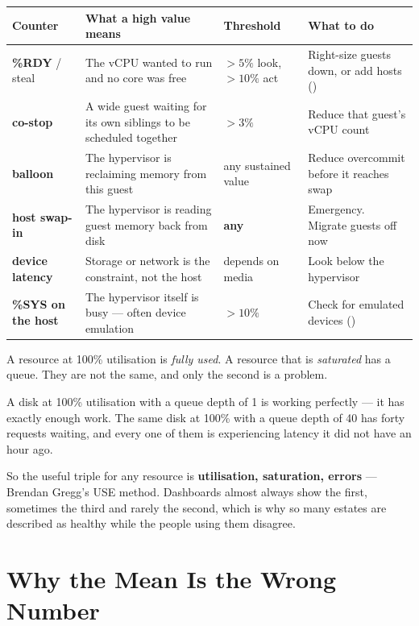 \begin{longtable}{@{}L{2.7cm}L{4.5cm}L{2.5cm}L{4.5cm}@{}}
\toprule
{}
\textbf{Counter} & \textbf{What a high value means} & \textbf{Threshold} &
\textbf{What to do} \\
\midrule
\endhead
\textbf{\%RDY} / steal & The vCPU wanted to run and no core was free & $>5\%$
look, $>10\%$ act & Right-size guests down, or add hosts () \\
\textbf{co-stop} & A wide guest waiting for its own siblings to be scheduled
together & $>3\%$ & Reduce that guest's vCPU count \\
\textbf{balloon} & The hypervisor is reclaiming memory from this guest &
any sustained value & Reduce overcommit before it reaches swap \\
\textbf{host swap-in} & The hypervisor is reading guest memory back from disk &
\textbf{any} & Emergency. Migrate guests off now \\
\textbf{device latency} & Storage or network is the constraint, not the host &
depends on media & Look below the hypervisor \\
\textbf{\%SYS on the host} & The hypervisor itself is busy --- often device
emulation & $>10\%$ & Check for emulated devices () \\
\bottomrule
\end{longtable}

\begin{alertbox}
A resource at 100\% utilisation is \emph{fully used}. A resource that is
\emph{saturated} has a queue. They are not the same, and only the second is a
problem.

\smallskip
A disk at 100\% utilisation with a queue depth of 1 is working perfectly ---
it has exactly enough work. The same disk at 100\% with a queue depth of 40
has forty requests waiting, and every one of them is experiencing latency it
did not have an hour ago.

\smallskip
So the useful triple for any resource is \textbf{utilisation, saturation,
errors} --- Brendan Gregg's USE method. Dashboards almost always show the
first, sometimes the third and rarely the second, which is why so many
estates are described as healthy while the people using them disagree.
\end{alertbox}

\section{Why the Mean Is the Wrong Number}

